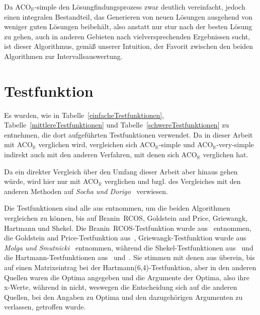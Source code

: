 \documentclass[fontsize=12, a4aper]{scrartcl}
\begin{document}
	\noindent Da ACO\(_{\mathbb{R}}\)-simple den Lösungfindungsprozess zwar deutlich vereinfacht, jedoch einen integralen Bestandteil, das Generieren von neuen Lösungen ausgehend von weniger guten Lösungen beibehält, also anstatt nur stur nach der besten Lösung zu gehen, auch in anderen Gebieten nach vielversprechenden Ergebnissen sucht, ist dieser Algorithmus, gemäß unserer Intuition, der Favorit zwischen den beiden Algorithmen zur Intervallsauswertung.
	
	\section{Testfunktion} \label{Testfunktionen}
	
	Es wurden, wie in Tabelle~\ref{einfacheTestfunktionen}, Tabelle~\ref{mittlereTestfunktionen} und Tabelle~\ref{schwereTestfunktionen} zu entnehmen, die dort aufgeführten Testfunktionen verwendet. Da in dieser Arbeit mit ACO\(_{\mathbb{R}}\) verglichen wird, vergleichen sich ACO\(_{\mathbb{R}}\)-simple und ACO\(_{\mathbb{R}}\)-very-simple indirekt auch mit den anderen Verfahren, mit denen sich ACO\(_{\mathbb{R}}\) verglichen hat.\hfill\newline
	
	Da ein direkter Vergleich über den Umfang dieser Arbeit aber hinaus gehen würde, wird hier nur mit ACO\(_{\mathbb{R}}\) verglichen und bzgl. des Vergleiches mit den anderen Methoden auf \textit{Socha und Dorigo}~\cite{socha2008ant} verwiesen.\hfill\newline
	
	Die Testfunktionen sind alle aus \cite{socha2008ant} entnommen, um die beiden Algorithmen vergleichen zu können, bis auf Branin~RCOS, Goldstein and Price, Griewangk, Hartmann und Shekel. Die Branin~RCOS-Testfunktion wurde aus~\cite{testFunctionBranin}  entnommen, die Goldstein and Price-Testfunktion aus~\cite{testFunctionGoldsteinandPrice}, Griewangk-Testfunktion wurde aus \textit{Molga und Smutnicki}~\cite{molga2005test} entnommen, während die Shekel-Testfunktionen aus~\cite{testFunctionShekel} und die Hartmann-Testfunktionen aus~\cite{testFunctionHartmann3} und~\cite{testFunctionHartmann6}. Sie stimmen mit denen aus \cite{socha2008ant} überein, bis auf einen Matrixeintrag bei der Hartmann(6,4)-Testfunktion, aber in den anderen Quellen waren die Optima angegeben und die Argumente der Optima, also ihre x-Werte, während in \cite{socha2008ant} nicht, weswegen die Entscheidung sich auf die anderen Quellen, bei den Angaben zu Optima und den dazugehörigen Argumenten zu verlassen, getroffen wurde.\hfill\newline
	
\end{document}
